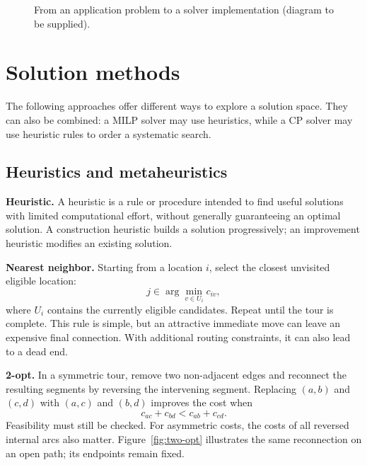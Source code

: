 \begin{figure}[htbp]
 \centering
 \caption{From an application problem to a solver implementation
 (diagram to be supplied).}
 \label{fig:modeling-process}
\end{figure}

\section{Solution methods}

The following approaches offer different ways to explore a solution space.
They can also be combined: a MILP solver may use heuristics, while a CP solver
may use heuristic rules to order a systematic search.

\subsection{Heuristics and metaheuristics}

\textbf{Heuristic.} A heuristic is a rule or procedure intended to find useful
solutions with limited computational effort, without generally guaranteeing
an optimal solution. A construction heuristic builds a solution progressively;
an improvement heuristic modifies an existing solution.

\textbf{Nearest neighbor.} Starting from a location $i$, select the closest
unvisited eligible location:
\[
 j\in\arg\min_{v\in U_i}c_{iv},
\]
where $U_i$ contains the currently eligible candidates. Repeat until the tour
is complete. This rule is simple, but an attractive immediate move can leave
an expensive final connection. With additional routing constraints, it can
also lead to a dead end.

\textbf{2-opt.} In a symmetric tour, remove two non-adjacent edges and reconnect
the resulting segments by reversing the intervening segment. Replacing
$(a,b)$ and $(c,d)$ with $(a,c)$ and $(b,d)$ improves the cost when
\[
 c_{ac}+c_{bd}<c_{ab}+c_{cd}.
\]
Feasibility must still be checked. For asymmetric costs, the costs of all
reversed internal arcs also matter. Figure~\ref{fig:two-opt} illustrates the
same reconnection on an open path; its endpoints remain fixed.

